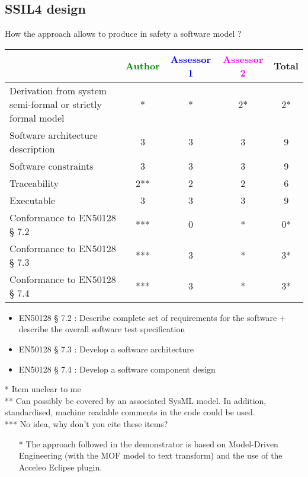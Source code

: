 \subsection{SSIL4 design}

How the approach allows to produce in safety a software model ?

\begin{tabular}{|l | c | c | c | c|}
\hline
& \textcolor{green}{Author} & \textcolor{blue}{Assessor 1} & \textcolor{magenta}{Assessor 2} & Total \\
\hline
Derivation from system semi-formal or strictly formal model &* & * &2* & 2* \\
\hline
Software architecture description &3 & 3 &3 & 9 \\
\hline
Software constraints &3 &3 &3 & 9 \\
\hline
Traceability &2** &2 &2 & 6 \\
\hline
Executable &3 &3 &3 & 9 \\
\hline
Conformance to EN50128 § 7.2 &*** &0 & *  & 0* \\
\hline
Conformance to EN50128 § 7.3 &*** &3 &  * & 3* \\
\hline
Conformance to EN50128 § 7.4 &*** &3 & * & 3* \\
\hline
\end{tabular}
\begin{assessor1}
\begin{itemize}
\item  EN50128 § 7.2 : Describe complete set of requirements for the
  software + describe the overall software test specification
\item EN50128 § 7.3 :  Develop a software architecture 
\item EN50128 § 7.4 : Develop a software component design
\end{itemize}
\end{assessor1}

\begin{author_comment}
* Item unclear to me\\
** Can possibly be covered by an associated SysML model. In addition, standardised, machine readable comments in the code could be used.\\
*** No idea, why don't you cite these items?
\end{author_comment}

\begin{assessor2}
  \begin{itemize}
  \item[*] The approach followed in the demonstrator is based on
    Model-Driven Engineering (with the MOF model to text transform)
    and the use of the Acceleo Eclipse plugin.
  \end{itemize}  
\end{assessor2}



